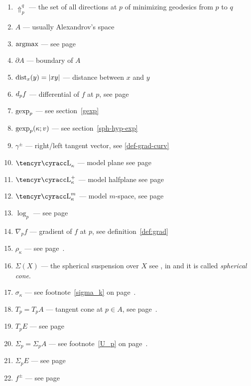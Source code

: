 \documentclass{article}
\begin{document}
\begin{enumerate}[$\diamond$]
\item $\Uparrow_p^q$ --- the set of all directions at $p$ of minimizing geodesics from $p$ to $q$ 

\item $A$ --- usually Alexandrov's space

\item $\operatorname{argmax}$ --- see page~\pageref{argmax}

\item $\partial A$ --- boundary of $A$

\item $\operatorname{dist}_x(y)=|x y|$  --- distance between $x$ and $y$

\item $d_p f$ --- differential of $f$ at $p$, see page~\pageref{def:df}

\item $\operatorname{gexp}_p$ --- see section~\ref{gexp} 

\item $\operatorname{gexp}_p(\kappa;v)$ --- see section~\ref{sph-hyp-exp}

\item $\gamma^\pm$ --- right/left tangent vector, see \ref{def-grad-curv}

\item $\Lob_\kappa$ --- model plane see page~\pageref{Lob_k}

\item $\Lob_\kappa^+$ --- model halfplane see page~\pageref{Lob_k^+}

\item $\Lob_\kappa^m$ --- model $m$-space, see page~\pageref{lob-k-m}

\item $\log_p$ --- see page~\pageref{log}

\item $\nabla_p f$ --- gradient of $f$ at $p$, see definition~\ref{def:grad}

\item $\rho_\kappa$ --- see page~\pageref{rho_k}.

\item $\Sigma(X)$ --- the spherical suspension over $X$ see \cite[4.3.1]{BGP}, in \cite[89]{plaut:survey} and \cite{berestovskii} it is called \emph{spherical cone}.

\item $\sigma_\kappa$ --- see footnote~\ref{sigma_k} on page~\pageref{sigma_k}.

\item $T_p=T_p A$ --- tangent cone at $p\in A$, see page~\pageref{T_p}.

\item $T_p E$ --- see page~\pageref{T_pE}

\item $\Sigma_p=\Sigma_p A$ --- see footnote~\ref{U_p} on page~\pageref{U_p}.

\item $\Sigma_p E$ --- see page~\pageref{U_pX}

\item $f^\pm$ --- see page~\pageref{def-grad-curv}

\end{enumerate}
\end{document}
